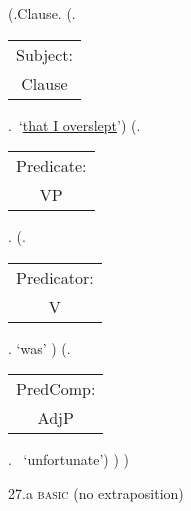 \documentclass[12pt,letterpaper]{article}
\begin{document}
\begin{figure}
	\begin{center}
		\begin{parsetree}
			(.Clause.
			(.\begin{tabular}{c}Subject:\\Clause\end{tabular}.~`\underline{that I overslept}')
			(.\begin{tabular}{c}Predicate:\\VP\end{tabular}.
			(.\begin{tabular}{c}Predicator:\\V\end{tabular}. `was' )
			(.\begin{tabular}{c}PredComp:\\AdjP\end{tabular}.~ 
			`unfortunate')
			)
			)
			
			\hfill \break\hfill \break
		\end{parsetree}
		27.a \textsc{basic} (no extraposition)
	\end{center}
\end{figure}
\end{document}
